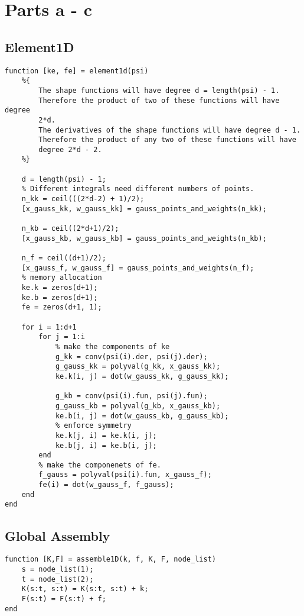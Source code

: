 \documentclass[10pt]{article}
\begin{document}
\section*{Parts a - c}
\subsection*{Element1D}
\begin{lstlisting}
function [ke, fe] = element1d(psi)
    %{
        The shape functions will have degree d = length(psi) - 1.
        Therefore the product of two of these functions will have degree
        2*d.
        The derivatives of the shape functions will have degree d - 1. 
        Therefore the product of any two of these functions will have
        degree 2*d - 2. 
    %}

    d = length(psi) - 1;
    % Different integrals need different numbers of points.
    n_kk = ceil(((2*d-2) + 1)/2);
    [x_gauss_kk, w_gauss_kk] = gauss_points_and_weights(n_kk);

    n_kb = ceil((2*d+1)/2);
    [x_gauss_kb, w_gauss_kb] = gauss_points_and_weights(n_kb);

    n_f = ceil((d+1)/2);
    [x_gauss_f, w_gauss_f] = gauss_points_and_weights(n_f);
    % memory allocation
    ke.k = zeros(d+1);
    ke.b = zeros(d+1);
    fe = zeros(d+1, 1);

    for i = 1:d+1
        for j = 1:i
            % make the components of ke
            g_kk = conv(psi(i).der, psi(j).der);
            g_gauss_kk = polyval(g_kk, x_gauss_kk);
            ke.k(i, j) = dot(w_gauss_kk, g_gauss_kk);

            g_kb = conv(psi(i).fun, psi(j).fun);
            g_gauss_kb = polyval(g_kb, x_gauss_kb);
            ke.b(i, j) = dot(w_gauss_kb, g_gauss_kb);
            % enforce symmetry
            ke.k(j, i) = ke.k(i, j);
            ke.b(j, i) = ke.b(i, j);
        end
        % make the componenets of fe.
        f_gauss = polyval(psi(i).fun, x_gauss_f);
        fe(i) = dot(w_gauss_f, f_gauss);
    end
end
\end{lstlisting}
\subsection*{Global Assembly}
\begin{lstlisting}
function [K,F] = assemble1D(k, f, K, F, node_list)
    s = node_list(1);
    t = node_list(2);
    K(s:t, s:t) = K(s:t, s:t) + k;
    F(s:t) = F(s:t) + f;
end
\end{lstlisting}
\end{document}
